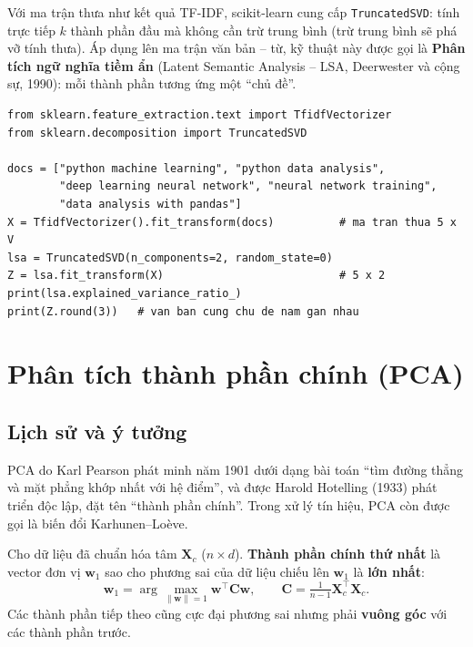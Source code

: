 
Với ma trận thưa như kết quả TF-IDF, scikit-learn cung cấp \texttt{TruncatedSVD}: tính trực tiếp $k$ thành phần đầu mà không cần trừ trung bình (trừ trung bình sẽ phá vỡ tính thưa). Áp dụng lên ma trận văn bản -- từ, kỹ thuật này được gọi là \textbf{Phân tích ngữ nghĩa tiềm ẩn} (Latent Semantic Analysis -- LSA, Deerwester và cộng sự, 1990): mỗi thành phần tương ứng một ``chủ đề''.

\begin{lstlisting}[caption={LSA: TF-IDF + TruncatedSVD}]
from sklearn.feature_extraction.text import TfidfVectorizer
from sklearn.decomposition import TruncatedSVD

docs = ["python machine learning", "python data analysis",
        "deep learning neural network", "neural network training",
        "data analysis with pandas"]
X = TfidfVectorizer().fit_transform(docs)          # ma tran thua 5 x V
lsa = TruncatedSVD(n_components=2, random_state=0)
Z = lsa.fit_transform(X)                           # 5 x 2
print(lsa.explained_variance_ratio_)
print(Z.round(3))   # van ban cung chu de nam gan nhau
\end{lstlisting}

\section{Phân tích thành phần chính (PCA)}

\subsection{Lịch sử và ý tưởng}
PCA do Karl Pearson phát minh năm 1901 dưới dạng bài toán ``tìm đường thẳng và mặt phẳng khớp nhất với hệ điểm'', và được Harold Hotelling (1933) phát triển độc lập, đặt tên ``thành phần chính''. Trong xử lý tín hiệu, PCA còn được gọi là biến đổi Karhunen--Loève.

\begin{definition}
Cho dữ liệu đã chuẩn hóa tâm $\mathbf{X}_c$ ($n \times d$). \textbf{Thành phần chính thứ nhất} là vector đơn vị $\mathbf{w}_1$ sao cho phương sai của dữ liệu chiếu lên $\mathbf{w}_1$ là \textbf{lớn nhất}:
\begin{equation}
    \mathbf{w}_1 = \arg\max_{\|\mathbf{w}\| = 1} \mathbf{w}^{\top} \mathbf{C} \mathbf{w}, \qquad \mathbf{C} = \tfrac{1}{n - 1}\mathbf{X}_c^{\top}\mathbf{X}_c .
\end{equation}
Các thành phần tiếp theo cũng cực đại phương sai nhưng phải \textbf{vuông góc} với các thành phần trước.
\end{definition}


